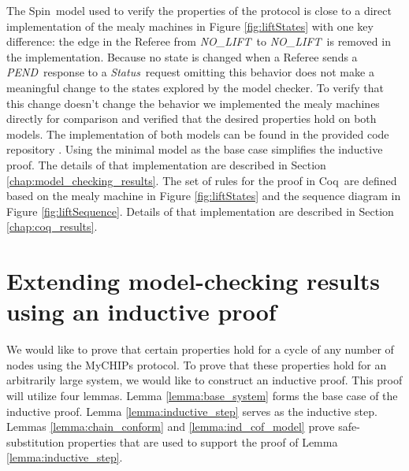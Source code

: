 \documentclass[runningheads]{llncs}
\newcommand{\nolift}{\emph{NO\_LIFT}}
\newcommand{\pend}{\emph{PEND}}
\newcommand{\status}{\emph{Status}}
\newcommand{\figref}[1]{Figure \ref{#1}}
\newcommand{\secref}[1]{Section \ref{#1}}
\newcommand{\spin}{Spin}
\newcommand{\coq}{Coq}
\newcommand{\coderepository}{provided code repository \cite{Storey_Extending_Model_Checking_2023}}
\newif\ifcomments
\newcommand{\egm}[1]{\ifcomments\textcolor{orange}{egm: #1}\fi}
\begin{document}
The \spin\ model used to verify the properties of the protocol is close to a direct implementation of the mealy machines in \figref{fig:liftStates} with one key difference: the edge in the Referee from \nolift\ to \nolift\ is removed in the implementation. Because no state is changed when a Referee sends a \pend\ response to a \status\ request omitting this behavior does not make a meaningful change to the states explored by the model checker. To verify that this change doesn't change the behavior we implemented the mealy machines directly for comparison and verified that the desired properties hold on both models. The implementation of both models can be found in the \coderepository. Using the minimal model as the base case simplifies the inductive proof. 
The details of that implementation are described in \secref{chap:model_checking_results}. The set of rules for the proof in \coq\ are defined based on the mealy machine in \figref{fig:liftStates} and the sequence diagram in 
 \figref{fig:liftSequence}. Details of that implementation are described in \secref{chap:coq_results}.
 
\section{Extending model-checking results using an inductive proof}
\label{sec:extending}

\egm{Create a \emph{\textbackslash lemmaRef} macro for referring to Lemmas. Replace everywhere.}

We would like to prove that certain properties hold for a cycle of any number of nodes using the MyCHIPs protocol.
To prove that these properties hold for an arbitrarily large system, we would like to construct an inductive proof. This proof will utilize four lemmas. Lemma \ref{lemma:base_system} forms the base case of the inductive proof. Lemma \ref{lemma:inductive_step} serves as the inductive step. Lemmas \ref{lemma:chain_conform} and \ref{lemma:ind_cof_model}  prove safe-substitution properties that are used to support the proof of Lemma \ref{lemma:inductive_step}.
\end{document}

